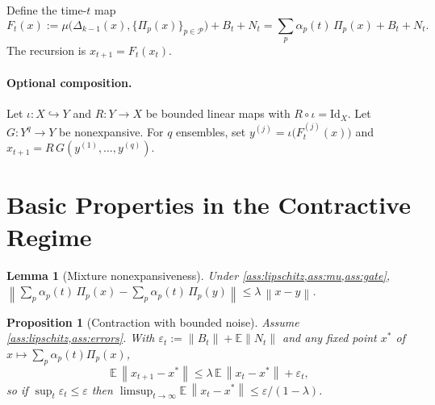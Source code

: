 \documentclass[11pt]{article}
\newtheorem{lemma}{Lemma}
\newtheorem{proposition}{Proposition}
\theoremstyle{definition}
\newcommand{\Id}{\mathrm{Id}}
\newcommand{\E}{\mathbb{E}}
\newcommand{\norm}[1]{\left\lVert #1\right\rVert}
\newcommand{\gate}{\Delta}
\begin{document}
Define the time-$t$ map
\begin{equation}
F_t(x):=\mu\big(\gate_{k-1}(x),\{\Pi_p(x)\}_{p\in\mathcal P}\big)+B_t+N_t = \sum_{p}\alpha_p(t)\,\Pi_p(x)+B_t+N_t.
\end{equation}
The recursion is $x_{t+1}=F_t(x_t)$.

\paragraph{Optional composition.} Let $\iota:X\hookrightarrow Y$ and $R:Y\to X$ be bounded linear maps with $R\circ\iota=\Id_X$. Let $G:Y^q\to Y$ be nonexpansive. For $q$ ensembles, set $y^{(j)}=\iota\big(F^{(j)}_t(x)\big)$ and $x_{t+1}=R\,G(y^{(1)},\dots,y^{(q)})$.

\section{Basic Properties in the Contractive Regime}
\begin{lemma}[Mixture nonexpansiveness]\label{lem:mixture}
Under \cref{ass:lipschitz,ass:mu,ass:gate}, $\norm{\sum_p \alpha_p(t)\,\Pi_p(x)-\sum_p \alpha_p(t)\,\Pi_p(y)}\le \lambda\,\norm{x-y}$.
\end{lemma}
\begin{proposition}[Contraction with bounded noise]\label{prop:contraction-noise}
Assume \cref{ass:lipschitz,ass:errors}. With $\varepsilon_t:=\norm{B_t}+\E\norm{N_t}$ and any fixed point $x^*$ of $x\mapsto\sum_p\alpha_p(t)\Pi_p(x)$,
\[
\E\,\norm{x_{t+1}-x^*}\le \lambda\,\E\,\norm{x_t-x^*}+\varepsilon_t,
\]
so if $\sup_t\varepsilon_t\le\varepsilon$ then $\limsup_{t\to\infty}\E\,\norm{x_t-x^*}\le \varepsilon/(1-\lambda)$.
\end{proposition}
\end{document}
